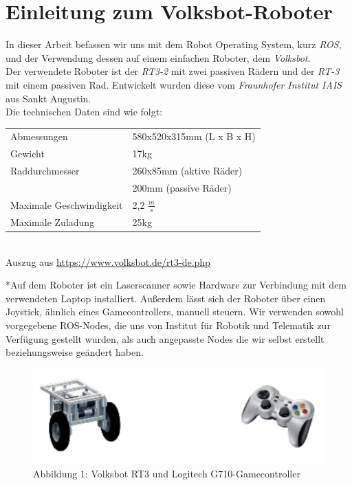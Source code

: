 \documentclass[11pt,a4paper]{article}
\begin{document}
\section{Einleitung zum Volksbot-Roboter}
In dieser Arbeit befassen wir uns mit dem Robot Operating System, kurz \textit{ROS}, und der 
Verwendung dessen auf einem einfachen Roboter, dem \textit{Volksbot}. \\
Der verwendete Roboter ist der \textit{RT3-2} mit zwei passiven Rädern und der \textit{RT-3} mit einem passiven Rad.
Entwickelt wurden diese vom \textit{Fraunhofer Institut IAIS} aus Sankt Augustin. \\
Die technischen Daten sind wie folgt: \\
\vspace{1mm}
\begin{center}
\begin{tabular}{| p{5cm} p{5cm} |}
  \hline
  Abmessungen & 580x520x315mm (L x B x H) \\
  Gewicht & 17kg \\
  
  Raddurchmesser & 260x85mm (aktive Räder) \\
   & 200mm (passive Räder) \\
  Maximale Geschwindigkeit & 2,2 $\frac{m}{s}$ \\
  
  Maximale Zuladung & 25kg \\
  \hline
\end{tabular} \\
\small{ Auszug aus \url{https://www.volksbot.de/rt3-de.php}}
\end{center}
\vspace{5mm}
*Auf dem Roboter ist ein Laserscanner sowie Hardware zur Verbindung mit dem verwendeten
Laptop installiert. Außerdem lässt sich der Roboter über einen Joystick, ähnlich eines Gamecontrollers, manuell steuern. 
Wir verwenden sowohl vorgegebene ROS-Nodes, die uns von Institut für Robotik und Telematik zur Verfügung gestellt wurden, als auch angepasste Nodes die wir selbst erstellt beziehungsweise
geändert haben. 
\vspace{5mm}
\begin{figure}[H]
  \caption*{Abbildung 1: Volksbot RT3 und Logitech G710-Gamecontroller}
  \includegraphics[]{robotandcontroller.pdf}
  \centering
\end{figure}
\newpage
\end{document}
